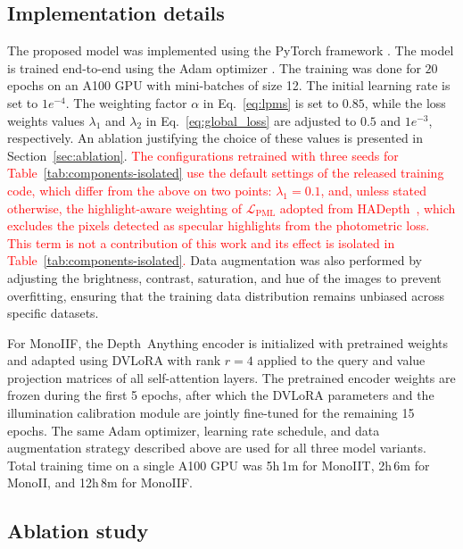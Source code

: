 \documentclass[a4paper,fleqn]{cas-dc}
\begin{document}
{\subsection{Implementation details}

The proposed model was implemented using the PyTorch framework \citep{pytorch_2019}. The model is trained end-to-end  using the Adam optimizer \citep{Adam_ICLR_2015}. The training was done for $20$ epochs on an A100 GPU with mini-batches of size 12. The initial learning rate is set to $1e^{-4}$. The weighting factor $\alpha$ in Eq.~\eqref{eq:lpms} is set to $0.85$, while the loss weights values $\lambda_1$ and $\lambda_2$ in Eq.~\eqref{eq:global_loss} are adjusted to $0.5$ and $1 e^{-3}$, respectively. An ablation justifying the choice of these values is presented in Section~\ref{sec:ablation}. \textcolor{red}{The configurations retrained with three seeds for Table~\ref{tab:components-isolated} use the default settings of the released training code, which differ from the above on two points: $\lambda_1 = 0.1$, and, unless stated otherwise, the highlight-aware weighting of $\mathcal{L}_\textrm{PML}$ adopted from HADepth~\citep{HAdepth_2025}, which excludes the pixels detected as specular highlights from the photometric loss. This term is not a contribution of this work and its effect is isolated in Table~\ref{tab:components-isolated}.} Data augmentation was also performed by adjusting the brightness, contrast, saturation, and hue of the images to prevent overfitting,  ensuring that the training data distribution remains unbiased across specific datasets. 
%

For MonoIIF, the Depth~Anything encoder is initialized with pretrained weights and adapted using DVLoRA with 
rank $r=4$ applied to the query and value projection matrices of all self-attention layers. The pretrained 
encoder weights are frozen during the first 5 epochs, after which the DVLoRA parameters and the illumination 
calibration module are jointly fine-tuned for the remaining 15 epochs. The same Adam optimizer, learning 
rate schedule, and data augmentation strategy described above are used for all three model variants. Total 
training time on a single A100 GPU was 5h\,1m for MonoIIT, 2h\,6m for MonoII, and 12h\,8m for MonoIIF.
%
\subsection{Ablation study \label{sec:ablation}}
%

}
\end{document}
